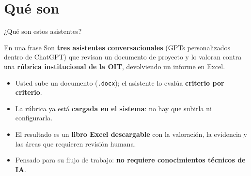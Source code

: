 \documentclass[aspectratio=169,11pt]{beamer}
\newcommand{\redlead}[1]{\textbf{\color{iloRed}#1}}
\newcommand{\bluelead}[1]{\textbf{\color{iloBlue}#1}}
\begin{document}
\section{Qué son}
\begin{frame}{¿Qué son estos asistentes?}
  \begin{block}{En una frase}
    Son \bluelead{tres asistentes conversacionales} (GPTs personalizados dentro de ChatGPT) que revisan un documento de proyecto y lo valoran contra una \bluelead{rúbrica institucional de la OIT}, devolviendo un informe en Excel.
  \end{block}
  \vspace{0.2cm}
  \begin{itemize}
    \item Usted sube un documento (\texttt{.docx}); el asistente lo evalúa \redlead{criterio por criterio}.
    \item La rúbrica ya está \bluelead{cargada en el sistema}: no hay que subirla ni configurarla.
    \item El resultado es un \bluelead{libro Excel descargable} con la valoración, la evidencia y las áreas que requieren revisión humana.
    \item Pensado para su flujo de trabajo: \redlead{no requiere conocimientos técnicos de IA}.
  \end{itemize}
\end{frame}
\end{document}
